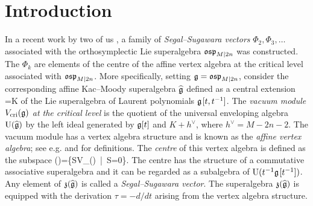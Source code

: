 \documentclass[12pt]{article}
\begin{document}
\author{{Alexander Molev, \quad Madeline Nurcombe \quad and\quad Eric Ragoucy}}



\date{} %
\maketitle


\begin{abstract}
We consider the recently constructed Segal--Sugawara vectors
for the orthosymplectic Lie superalgebras. We calculate their images with respect to the Harish-Chandra
homomorphism and extend this calculation to the associated Sugawara operators and Casimir elements.
We also produce higher Gaudin Hamiltonians and elements of the quantum shift-of-argument subalgebras
in the orthosymplectic enveloping algebra. In the Appendix, we review analogous results for
the general linear Lie superalgebras.




\end{abstract}

\section{Introduction}
\label{sec:int}

In a recent work by two of us \cite{mn:ss}, a family of {\em Segal--Sugawara vectors} $\Phi_2, \Phi_3,\dots$ associated
with the orthosymplectic Lie superalgebra $\mathfrak{osp}_{M|2n}$ was constructed. The $\Phi_k$ are elements
of the centre of the affine vertex algebra at the critical level associated with $\mathfrak{osp}_{M|2n}$.
More specifically, setting $\mathfrak{g}=\mathfrak{osp}_{M|2n}$, consider
the corresponding
affine Kac--Moody superalgebra $\widehat{\mathfrak{g}}$ defined as a central extension
\wh\g=\g\tss[t,t^{-1}]\oplus\CC K
\eeq
of the Lie
superalgebra of Laurent polynomials $\mathfrak{g}\hspace{1pt}[t,t^{-1}]$.
The {\em vacuum module $V_{{\rm cri}}(\mathfrak{g})$ at the critical level}
is the quotient of the
universal enveloping algebra ${\rm U}(\widehat{\mathfrak{g}})$ by the left
ideal generated by $\mathfrak{g}[t]$ and $K+h^\vee$,
where $h^\vee=M-2n-2$.
The vacuum module has a vertex algebra structure and is known as
the {\em affine vertex algebra}; see e.g.
\cite{f:lc} and \cite{k:va} for definitions. The {\em centre}
of this vertex algebra is defined as the subspace
\z(\wh\g)=\{S\in V_{\cri}(\g)\ |\ \g[t]\ts S=0\}.
\eeq
The centre has the structure of
a commutative associative superalgebra and it
can be regarded as a subalgebra of ${\rm U}(t^{-1}\mathfrak{g}\hspace{1pt}[t^{-1}])$.
Any element of $\mathfrak{z}(\widehat{\mathfrak{g}})$
is called a {\em Segal--Sugawara vector\/}.
The superalgebra $\mathfrak{z}(\widehat{\mathfrak{g}})$ is equipped with the derivation $\tau=-d/dt$
arising from the vertex algebra structure.
\end{document}
